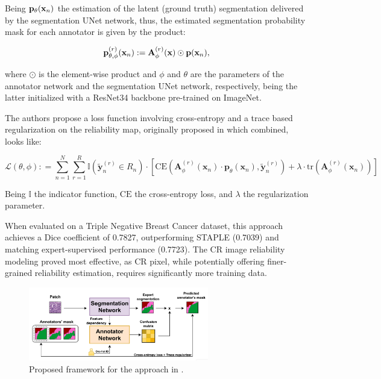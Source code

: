 Being $\mathbf{p}_\theta(\mathbf{x}_n)$ the estimation of the latent (ground
truth) segmentation delivered by the segmentation UNet network, thus,
the estimated segmentation probability mask for each annotator is
given by the product:

\begin{equation}
  \label{eq:estimated_segmentation}
  \mathbf{p}^{(r)}_{\theta,\phi}(\mathbf{x}_n) :=
  \mathbf{A}^{(r)}_{\phi}(\mathbf{x}) \odot \mathbf{p}(\mathbf{x}_n),
\end{equation}

where $\odot$ is the element-wise product and $\phi$ and $\theta$ are
the parameters of the annotator network and the segmentation UNet
network, respectively, being the latter initialized with a ResNet34 backbone
pre-trained on ImageNet.

The authors propose a loss function involving cross-entropy and a trace based
regularization on the reliability map, originally proposed in
\cite{ZhangEtAl2020} which combined, looks like:

\begin{equation}
  \mathcal{L}(\theta, \phi) : = \sum_{n=1}^{N} \sum_{r=1}^{R}
  \mathbb{I} \left( \tilde{\mathbf{y}}_{n}^{(r)} \in R_n \right)
  \cdot \left[ \text{CE} \left( \mathbf{A}_{\phi}^{(r)}
      (\mathbf{x}_n) \cdot \mathbf{p}_{\theta} (\mathbf{x}_n),
    \tilde{\mathbf{y}}_{n}^{(r)} \right) + \lambda \cdot \text{tr}
  \left( \mathbf{A}_{\phi}^{(r)} (\mathbf{x}_n) \right) \right]
\end{equation}

Being $\mathbb{I}$ the indicator function, $\text{CE}$ the cross-entropy loss,
and $\lambda$ the regularization parameter.

When evaluated on a Triple Negative Breast Cancer dataset, this
approach achieves a Dice coefficient of 0.7827, outperforming STAPLE
(0.7039) and matching expert-supervised performance (0.7723). The CR
image reliability modeling proved most effective, as CR pixel, while
potentially offering finer-grained reliability estimation, requires
significantly more training data.

\begin{figure}
  \centering
  \includegraphics[width=0.7\textwidth]{Cap1/Figures/lopez_2024_proposed_framework.png}
  \caption{Proposed framework for the approach in \cite{LopezEtAl2024}.}
  \label{fig:lopez_2024_proposed_framework}
\end{figure}

